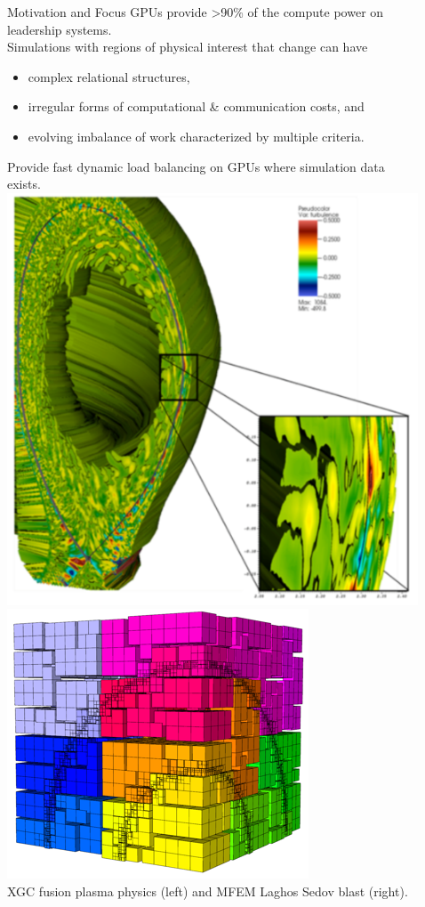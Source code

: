 \documentclass[final]{beamer}
\newlength{\sepwid}
\newlength{\onecolwid}
\begin{document}
\begin{frame}[t]
\begin{columns}[t]
\begin{column}{\onecolwid}
\begin{alertblock}{Motivation and Focus}
  GPUs provide >90\% of the compute power on leadership systems.\\
  Simulations with regions of physical interest that change can have\\
  \begin{itemize}
    \item complex relational structures,
    \item irregular forms of computational \& communication costs, and
    \item evolving imbalance of work characterized by multiple criteria.
  \end{itemize}
  Provide fast dynamic load balancing on GPUs where simulation data exists. \\
  \vskip1cm
  \includegraphics[width=.45\textwidth]{../salishan2019/figures/xgcCase.png}
  \includegraphics[width=.45\textwidth]{../salishan2019/figures/laghos_sedov.png}\\
  \small{XGC fusion plasma physics (left) and MFEM Laghos Sedov blast
  (right).}
\end{alertblock}

\end{column} %
\begin{column}{\sepwid}\end{column} %
\begin{column}{\onecolwid} %


\end{column}
\end{columns}
\end{frame}
\end{document}
